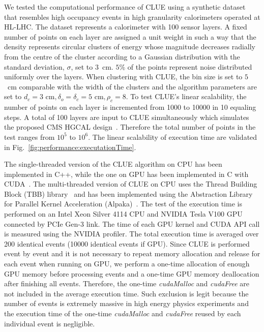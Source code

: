 
We tested the computational performance of CLUE using a synthetic dataset that resembles high occupancy events in high granularity calorimeters operated at HL-LHC. The dataset represents a calorimeter with 100 sensor layers. A fixed number of points on each layer are assigned a unit weight in such a way that the density represents circular clusters of energy whose magnitude decreases radially from the centre of the cluster according to a Gaussian distribution with the standard deviation, $\sigma$, set to $3$~cm.
$5$\% of the points represent noise distributed
uniformly over the layers. When clustering with CLUE, the bin size is set to $5$~cm comparable with the width of the clusters and the
algorithm parameters are set to $d_c=3 \text{ cm},\delta_o=\delta_c=5 \text{ cm},\rho_c=8$. To test CLUE's linear scalability, the number of points on each layer is incremented from 1000 to 10000 in 10 equaling steps. A total of 100 layers are input to CLUE simultaneously which simulates the proposed CMS HGCAL design~\cite{Collaboration:2293646}. Therefore the total number of points in the test ranges from $10^5$ to $10^6$. 
The linear scalability of execution time are validated in Fig.~\ref{fig:performance:executationTime}.



The single-threaded version of the CLUE algorithm on CPU has been implemented in C++, while the one on GPU has been implemented in C with CUDA~\cite{nvidia2011nvidia}. The multi-threaded version of CLUE on CPU uses the Thread Building Block (TBB) library~\cite{reinders2007intel} and has been implemented using the Abstraction Library for Parallel Kernel Acceleration (Alpaka)~\cite{zenker2016alpaka}. The test of the execution time is performed on an Intel Xeon Silver 4114 CPU and NVIDIA Tesla V100 GPU connected by PCIe Gen-3 link. The time of each GPU kernel and CUDA API call is measured using the NVIDIA profiler. The total execution time is averaged over 200 identical events (10000 identical events if GPU). Since CLUE is performed event by event and it is not necessary to repeat memory allocation and release for each event when running on GPU, we perform a one-time allocation of enough GPU memory before processing events and a one-time GPU memory deallocation after finishing all events. Therefore, the one-time \emph{cudaMalloc} and \emph{cudaFree} are not included in the average execution time. Such exclusion is legit because the number of events is extremely massive in high energy physics experiments and the execution time of the one-time \emph{cudaMalloc} and \emph{cudaFree} reused by each individual event is negligible.




